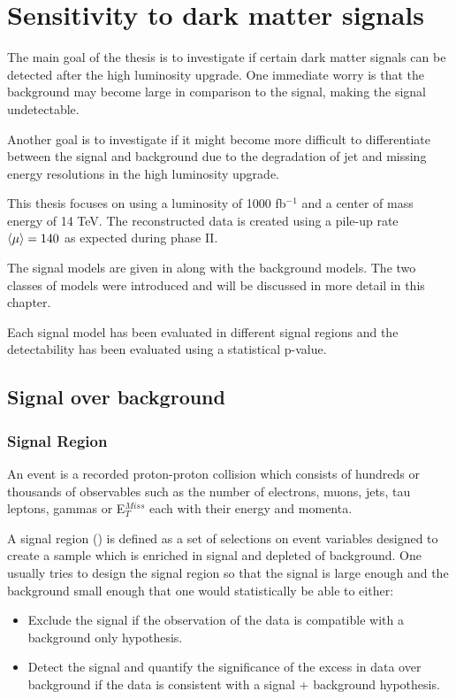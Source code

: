 \chapter{Sensitivity to dark matter signals}\label{cha:darkmatter}

The main goal of the thesis is to investigate if certain dark matter signals can be detected after the high luminosity upgrade. One immediate worry is that the background may become large in comparison to the signal, making the signal undetectable.

Another goal is to investigate if it might become more difficult to differentiate between the signal and background due to the degradation of jet and missing energy resolutions in the high luminosity upgrade.

This thesis focuses on using a luminosity of 1000 fb$^{-1}$ and a center of mass energy of 14 TeV. The reconstructed data is created using a pile-up rate $\left<\mu\right> = 140$ as expected during phase II.

The signal models are given in  along with the background models. The two classes of models were introduced  and will be discussed in more detail in this chapter.

Each signal model has been evaluated in different signal regions and the detectability has been evaluated using a statistical p-value. 

\newpage
\section{Signal over background}
\subsection{Signal Region}
An event is a recorded proton-proton collision which consists of hundreds or thousands of observables such as the number of electrons, muons, jets, tau leptons, gammas or E$^{Miss}_T$ each with their energy and momenta.

A signal region (\abbrSR) is defined as a set of selections on event variables designed to create a sample which is enriched in signal and depleted of background. One usually tries to design the signal region so that the signal is large enough and the background small enough that one would statistically be able to either:
\begin{itemize}
\item Exclude the signal if the observation of the data is compatible with a background only hypothesis.
\item Detect the signal and quantify the significance of the excess in data over background if the data is consistent with a signal + background hypothesis.
\end{itemize}

